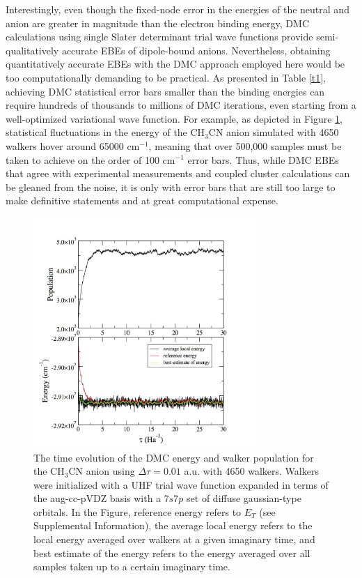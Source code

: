 Interestingly, even though the fixed-node error in the energies of the neutral and anion are greater in magnitude than the electron binding energy, DMC calculations using  single Slater determinant trial wave functions provide semi-qualitatively accurate EBEs of dipole-bound anions. Nevertheless, obtaining quantitatively accurate EBEs with the DMC approach employed here would be too computationally demanding to be practical. As presented in Table \ref{t1}, achieving DMC statistical error bars smaller than the binding energies can require hundreds of thousands to millions of DMC iterations, even starting from a well-optimized variational wave function. For example, as depicted in Figure \ref{f2}, statistical fluctuations in the energy of the CH$_{3}$CN anion simulated with 4650 walkers hover around 65000 cm$^{-1}$, meaning that over 500,000 samples must be taken to achieve on the order of 100 cm$^{-1}$ error bars. Thus, while DMC EBEs that agree with experimental measurements and coupled cluster calculations can be gleaned from the noise, it is only with error bars that are still too large to make definitive statements and at great computational expense.
\begin{center}
\begin{figure}[htbp]
\includegraphics[width=8.5cm]{Images/chapter2/DMC-4.pdf}
\caption{The time evolution of the DMC energy and walker population for the CH$_{3}$CN anion using $\Delta \tau = 0.01$ a.u. with 4650 walkers. Walkers were initialized with a UHF trial wave function expanded in terms of the aug-cc-pVDZ basis with a 7$s$7$p$ set of diffuse gaussian-type orbitals. In the Figure, reference energy refers to $E_{T}$ (see Supplemental Information), the average local energy refers to the local energy averaged over walkers at a given imaginary time, and best estimate of the energy refers to the energy averaged over all samples taken up to a certain imaginary time.}
\label{f2}
\end{figure}
\end{center}
